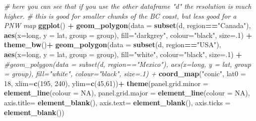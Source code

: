 \documentclass[]{book}
\newenvironment{Shaded}{\begin{snugshade}}{\end{snugshade}}
\newcommand{\KeywordTok}[1]{\textcolor[rgb]{0.13,0.29,0.53}{\textbf{#1}}}
\newcommand{\DataTypeTok}[1]{\textcolor[rgb]{0.13,0.29,0.53}{#1}}
\newcommand{\DecValTok}[1]{\textcolor[rgb]{0.00,0.00,0.81}{#1}}
\newcommand{\StringTok}[1]{\textcolor[rgb]{0.31,0.60,0.02}{#1}}
\newcommand{\CommentTok}[1]{\textcolor[rgb]{0.56,0.35,0.01}{\textit{#1}}}
\newcommand{\OtherTok}[1]{\textcolor[rgb]{0.56,0.35,0.01}{#1}}
\newcommand{\OperatorTok}[1]{\textcolor[rgb]{0.81,0.36,0.00}{\textbf{#1}}}
\newcommand{\NormalTok}[1]{#1}
\begin{document}
\begin{Shaded}
\begin{Highlighting}[]
\CommentTok{# here you can see that if you use the other dataframe "d" the resolution is much higher. }
\CommentTok{# this is good for smaller chunks of the BC coast, but less good for a PNW map}
\KeywordTok{ggplot}\NormalTok{() }\OperatorTok{+}\StringTok{ }
\StringTok{  }\KeywordTok{geom_polygon}\NormalTok{(}\DataTypeTok{data =} \KeywordTok{subset}\NormalTok{(d, region}\OperatorTok{==}\StringTok{"Canada"}\NormalTok{), }\KeywordTok{aes}\NormalTok{(}\DataTypeTok{x=}\NormalTok{long, }\DataTypeTok{y =}\NormalTok{ lat, }\DataTypeTok{group =}\NormalTok{ group), }\DataTypeTok{fill=}\StringTok{"darkgrey"}\NormalTok{, }\DataTypeTok{colour=}\StringTok{"black"}\NormalTok{, }\DataTypeTok{size=}\NormalTok{.}\DecValTok{1}\NormalTok{) }\OperatorTok{+}\StringTok{ }\KeywordTok{theme_bw}\NormalTok{()}\OperatorTok{+}
\StringTok{  }\KeywordTok{geom_polygon}\NormalTok{(}\DataTypeTok{data =} \KeywordTok{subset}\NormalTok{(d, region}\OperatorTok{==}\StringTok{"USA"}\NormalTok{), }\KeywordTok{aes}\NormalTok{(}\DataTypeTok{x=}\NormalTok{long, }\DataTypeTok{y =}\NormalTok{ lat, }\DataTypeTok{group =}\NormalTok{ group), }\DataTypeTok{fill=}\StringTok{"white"}\NormalTok{, }\DataTypeTok{colour=}\StringTok{"black"}\NormalTok{, }\DataTypeTok{size=}\NormalTok{.}\DecValTok{1}\NormalTok{) }\OperatorTok{+}
\StringTok{  }\CommentTok{#geom_polygon(data = subset(d, region=="Mexico"), aes(x=long, y = lat, group = group), fill="white", colour="black", size=.1) +}
\StringTok{  }\KeywordTok{coord_map}\NormalTok{(}\StringTok{"conic"}\NormalTok{, }\DataTypeTok{lat0 =} \DecValTok{18}\NormalTok{, }\DataTypeTok{xlim=}\KeywordTok{c}\NormalTok{(}\DecValTok{195}\NormalTok{, }\DecValTok{240}\NormalTok{), }\DataTypeTok{ylim=}\KeywordTok{c}\NormalTok{(}\DecValTok{45}\NormalTok{,}\DecValTok{61}\NormalTok{))}\OperatorTok{+}
\StringTok{  }\KeywordTok{theme}\NormalTok{(}\DataTypeTok{panel.grid.minor =} \KeywordTok{element_line}\NormalTok{(}\DataTypeTok{colour =} \OtherTok{NA}\NormalTok{),}
          \DataTypeTok{panel.grid.major =} \KeywordTok{element_line}\NormalTok{(}\DataTypeTok{colour =} \OtherTok{NA}\NormalTok{),}
          \DataTypeTok{axis.title=} \KeywordTok{element_blank}\NormalTok{(),}
          \DataTypeTok{axis.text=} \KeywordTok{element_blank}\NormalTok{(),}
          \DataTypeTok{axis.ticks =} \KeywordTok{element_blank}\NormalTok{())}
\end{Highlighting}
\end{Shaded}
\end{document}
